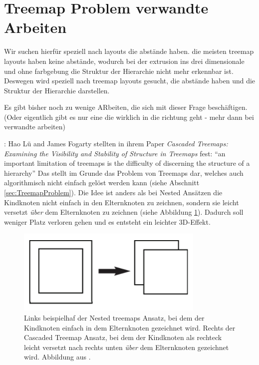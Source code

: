 \section{Treemap Problem verwandte Arbeiten}
Wir suchen hierfür speziell nach layouts die abstände haben. die meisten treemap layouts haben keine abstände, wodurch bei der extrusion ins drei dimensionale und ohne farbgebung die Struktur der Hierarchie nicht mehr erkennbar ist. Deswegen wird speziell nach treemap layouts gesucht, die abstände haben und die Struktur der Hierarchie darstellen.


Es gibt bisher noch zu wenige ARbeiten, die sich mit dieser Frage beschäftigen. (Oder eigentlich gibt es nur eine die wirklich in die richtung geht - mehr dann bei verwandte arbeiten)


\cite{lu2008cascaded}:
Hao Lü and James Fogarty stellten in ihrem Paper \textit{Cascaded Treemaps:
Examining the Visibility and Stability of Structure in Treemaps}\cite{lu2008cascaded} fest: \enquote{an important limitation of treemaps is
the difficulty of discerning the structure of a hierarchy}\cite[1]{lu2008cascaded} Das stellt im Grunde das Problem von Treemaps dar, welches auch algorithmisch nicht einfach gelöst werden kann (siehe Abschnitt \ref{sec:TreemapProblem}). Die Idee ist anders als bei Nested Ansätzen die Kindknoten nicht einfach in den Elternknoten zu zeichnen, sondern sie leicht versetzt \textit{über} dem Elternknoten zu zeichnen (siehe Abbildung \ref{fig:cascaded}). Dadurch soll weniger Platz verloren gehen und es entsteht ein leichter 3D-Effekt.

\begin{figure}
    \centering
    \includegraphics[width=0.8\textwidth]{images/cascaded.png}
    \caption{Links beispielhaf der Nested treemaps Ansatz, bei dem der Kindknoten einfach in dem Elternknoten gezeichnet wird. Rechts der Cascaded Treemap Ansatz, bei dem der Kindknoten als rechteck leicht versetzt nach rechts unten \textit{über} dem Elternknoten gezeichnet wird. Abbildung aus \cite[3]{lu2008cascaded}.}
    \label{fig:cascaded}
\end{figure}

